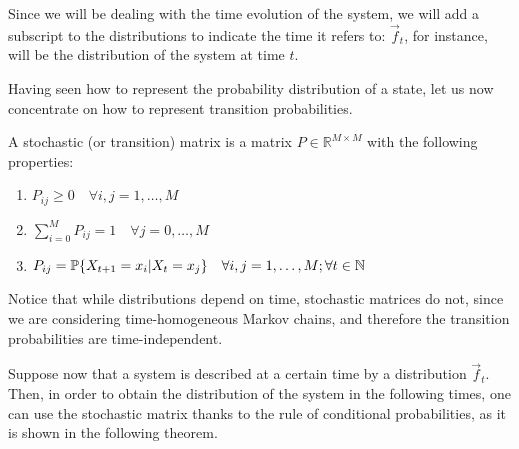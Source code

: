 Since we will be dealing with the time evolution of the system, we will add a subscript to the distributions to indicate the time it refers to: $\vec{f}_t$, for instance, will be the distribution of the system at time $t$.

Having seen how to represent the probability distribution of a state, let us now concentrate on how to represent transition probabilities.

\begin{ndef}  \label{def:stoc_matrix}
    A stochastic (or transition) matrix is a matrix $P \in \mathbb{R}^{M\times M}$ with the following properties:
    \begin{center}
        \begin{enumerate}
            \item $P_{ij} \geq 0 \quad \forall i,j = 1,\dots,M$
            \item $\sum_{i = 0}^M P_{ij} = 1 \quad \forall j = 0,\dots,M$
            \item $P_{ij} = \mathbb{P}\{X_{t+1} = x_i | X_t = x_j \} \quad \forall i,j = 1,\dots,M; \forall t\in \mathbb N$
        \end{enumerate}
    \end{center}
\end{ndef}

Notice that while distributions depend on time, stochastic matrices do not, since we are considering time-homogeneous Markov chains, and therefore the transition probabilities are time-independent.

\smallskip
Suppose now that a system is described at a certain time by a distribution $\vec{f}_t$. Then, in order to obtain the distribution of the system in the following times, one can use the stochastic matrix thanks to the rule of conditional probabilities, as it is shown in the following theorem.

